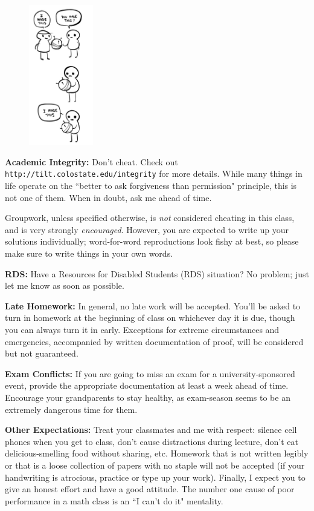 \documentclass[12pt]{amsbook}
\begin{document}
\begin{figure}
\includegraphics[width=0.25\textwidth]{imadethiscomic.jpg}
\end{figure}

\textbf{Academic Integrity:} Don't cheat. Check out \texttt{http://tilt.colostate.edu/integrity} for more details. While many things in life operate on the ``better to ask forgiveness than permission" principle, this is not one of them. When in doubt, ask me ahead of time.

Groupwork, unless specified otherwise, is \emph{not} considered cheating in this class, and is very strongly \emph{encouraged}. However, you are expected to write up your solutions individually; word-for-word reproductions look fishy at best, so please make sure to write things in your own words.

\textbf{RDS:} Have a Resources for Disabled Students (RDS) situation? No problem; just let me know as soon as possible.

\textbf{Late Homework:} In general, no late work will be accepted. You'll be asked to turn in homework at the beginning of class on whichever day it is due, though you can always turn it in early. Exceptions for extreme circumstances and emergencies, accompanied by written documentation of proof, will be considered but not guaranteed.

\textbf{Exam Conflicts:} If you are going to miss an exam for a university-sponsored event, provide the appropriate documentation at least a week ahead of time. Encourage your grandparents to stay healthy, as exam-season seems to be an extremely dangerous time for them.

\textbf{Other Expectations:} Treat your classmates and me with respect: silence cell phones when you get to class, don't cause distractions during lecture, don't eat delicious-smelling food without sharing, etc. Homework that is not written legibly or that is a loose collection of papers with no staple will not be accepted (if your handwriting is atrocious, practice or type up your work). Finally, I expect you to give an honest effort and have a good attitude. The number one cause of poor performance in a math class is an ``I can't do it" mentality.
\end{document}

